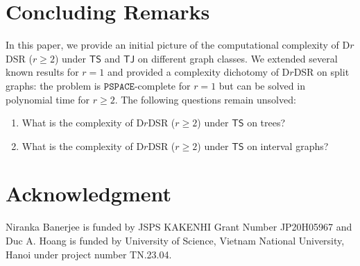\documentclass[a4paper]{article}
\theoremstyle{plain}
\theoremstyle{definition}
\newcommand{\sfTS}{{\mathsf{TS}}} %
\newcommand{\sfTJ}{{\mathsf{TJ}}} %
\newcommand{\ttPSPACE}{{\mathtt{PSPACE}}}
\begin{document}
\section{Concluding Remarks}
\label{sec:conclude}

In this paper, we provide an initial picture of the computational complexity of \textsc{D$r$DSR} ($r \geq 2$) under $\sfTS$ and $\sfTJ$ on different graph classes.
We extended several known results for $r = 1$ and provided a complexity dichotomy of \textsc{D$r$DSR} on split graphs: the problem is $\ttPSPACE$-complete for $r = 1$ but can be solved in polynomial time for $r \geq 2$.
The following questions remain unsolved:
\begin{enumerate}[{\bf {Question} 1:}]
	\item What is the complexity of \textsc{D$r$DSR} ($r \geq 2$) under $\sfTS$ on trees?
	\item What is the complexity of \textsc{D$r$DSR} ($r \geq 2$) under $\sfTS$ on interval graphs?
\end{enumerate}

\section*{Acknowledgment}
Niranka Banerjee is funded by JSPS KAKENHI Grant Number
JP20H05967 and Duc A. Hoang is funded by University of Science, Vietnam National University, Hanoi under project number TN.23.04.

\printbibliography
\end{document}
